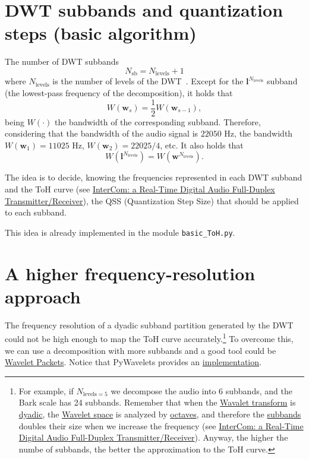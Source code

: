 \section{DWT subbands and quantization steps (basic algorithm)}
The number of DWT subbands
\begin{equation}
  N_{\text{sb}} = N_{\text{levels}} + 1
\end{equation}
where $N_{\text{levels}}$ is the number of levels of the
DWT~\cite{vetterli1995wavelets}. Except for the
${\mathbf l}^{N_{\text{levels}}}$ subband (the lowest-pass frequency
of the decomposition), it holds that
\begin{equation}
  W({\mathbf w}_s) = \frac{1}{2}W({\mathbf w}_{s-1}),
\end{equation}
being $W(\cdot)$ the bandwidth of the corresponding
subband. Therefore, considering that the bandwidth of the audio signal
is $22050$ Hz, the bandwidth $W({\mathbf w}_1)=11025$ Hz,
$W({\mathbf w}_2)=22025/4$, etc. It also holds that
\begin{equation}
  W({\mathbf l}^{N_{\text{levels}}}) = W({\mathbf w}^{N_{\text{levels}}}).
\end{equation}

The idea is to decide, knowing the frequencies represented in each DWT
subband and the ToH curve (see
\href{https://github.com/Tecnologias-multimedia/InterCom/blob/master/docs/2-hours_seminar.ipynb}{
  InterCom: a Real-Time Digital Audio Full-Duplex
  Transmitter/Receiver}), the QSS (Quantization Step Size) that should
be applied to each subband.

This idea is already implemented in the module \verb|basic_ToH.py|.

\section{A higher frequency-resolution approach}
\label{sec:more_subbands}

The frequency resolution of a dyadic subband partition generated by
the DWT could not be high enough to map the ToH curve
accurately.\footnote{For example, if $N_{\text{levels}=5}$ we
  decompose the audio into 6 subbands, and the Bark scale has 24
  subbands. Remember that when the
  \href{https://en.wikipedia.org/wiki/Wavelet_transform}{Wavalet
    transform} is
  \href{https://en.wikipedia.org/wiki/Dyadic_rational}{dyadic}, the
  \href{https://en.wikipedia.org/wiki/Discrete_wavelet_transform}{Wavelet
    space} is analyzed by
  \href{https://en.wikipedia.org/wiki/Octave_band}{octaves}, and
  therefore the
  \href{https://en.wikipedia.org/wiki/Filter_bank}{subbands} doubles
  their size when we increase the frequency (see \href{https://github.com/Tecnologias-multimedia/InterCom/blob/master/docs/2-hours_seminar.ipynb}{
  InterCom: a Real-Time Digital Audio Full-Duplex
  Transmitter/Receiver}). Anyway, the higher the numbe of subbands, the better the
  approximation to the ToH curve.} To overcome this, we can use a
decomposition with more subbands and a good tool could be
\href{https://en.wikipedia.org/wiki/Wavelet_packet_decomposition}{Wavelet
  Packets}. Notice that PyWavelets provides an
\href{https://pywavelets.readthedocs.io/en/latest/ref/wavelet-packets.html}{implementation}.

